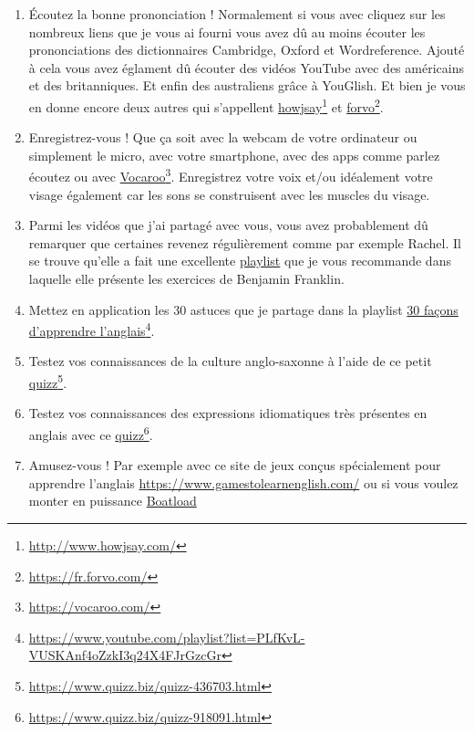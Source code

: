 \begin{enumerate}
  \item \'Ecoutez la bonne prononciation ! Normalement si vous avec
  cliquez sur les nombreux liens que je vous ai fourni vous avez dû au
  moins écouter les prononciations des dictionnaires Cambridge, Oxford
  et Wordreference. Ajouté à cela vous avez églament dû écouter des
  vidéos YouTube avec des américains et des britanniques. Et enfin des
  australiens grâce à YouGlish. Et bien je vous en donne encore deux autres qui
  s'appellent \href{http://www.howjsay.com/}{howjsay}\footnote{\url{http://www.howjsay.com/}}
  et \href{https://fr.forvo.com/}{forvo}\footnote{\url{https://fr.forvo.com/}}.
  \item Enregistrez-vous ! Que ça soit avec la webcam de votre
  ordinateur ou simplement le micro, avec votre smartphone, avec des
  apps comme parlez écoutez ou avec
  \href{https://vocaroo.com/}{Vocaroo}\footnote{\url{https://vocaroo.com/}}.
  Enregistrez votre voix et/ou idéalement votre visage également car
  les sons se construisent avec les muscles du visage.
  \item Parmi les vidéos que j'ai partagé avec vous, vous avez
    probablement dû remarquer que certaines revenez régulièrement
    comme par exemple Rachel. Il se trouve qu'elle a fait une
    excellente
    \href{https://www.youtube.com/playlist?list=PL27A5D7DE7D02373A}{playlist}
    que je vous recommande dans laquelle elle présente les exercices
    de Benjamin Franklin.
  \item Mettez en application les 30 astuces que je partage dans la
    playlist \href{https://www.youtube.com/playlist?list=PLfKvL-VUSKAnf4oZzkI3q24X4FJrGzcGr}{30 façons d'apprendre l'anglais}\footnote{\url{https://www.youtube.com/playlist?list=PLfKvL-VUSKAnf4oZzkI3q24X4FJrGzcGr}}.
  \item Testez vos connaissances de la culture anglo-saxonne à l'aide
    de ce petit \href{https://www.quizz.biz/quizz-436703.html}{quizz}\footnote{\url{https://www.quizz.biz/quizz-436703.html}}.
  \item Testez vos connaissances des expressions idiomatiques très
    présentes en anglais avec ce    \href{https://www.quizz.biz/quizz-918091.html}{quizz}\footnote{\url{https://www.quizz.biz/quizz-918091.html}}.
  \item Amusez-vous ! Par exemple avec ce site de jeux conçus
    spécialement pour apprendre l'anglais
    \url{https://www.gamestolearnenglish.com/} ou si vous voulez
    monter en puissance
    \href{https://www.boatloadpuzzles.com/playcrossword}{Boatload
}
\end{enumerate}
